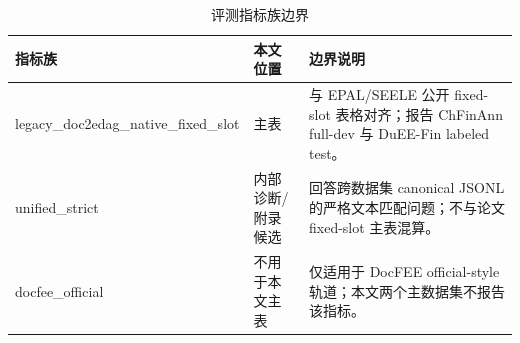 \begin{table}[htbp]
\centering
\caption{评测指标族边界}
\label{tab:metric-families}
\small
\begin{tabular}{>{\raggedright\arraybackslash}p{}>{\raggedright\arraybackslash}p{}>{\raggedright\arraybackslash}p{}}
\toprule
指标族 & 本文位置 & 边界说明 \\
\midrule
legacy\_\allowbreak{}doc2edag\_\allowbreak{}native\_\allowbreak{}fixed\_\allowbreak{}slot & 主表 & 与 EPAL/SEELE 公开 fixed-slot 表格对齐；报告 ChFinAnn full-dev 与 DuEE-Fin labeled test。 \\
unified\_\allowbreak{}strict & 内部诊断/附录候选 & 回答跨数据集 canonical JSONL 的严格文本匹配问题；不与论文 fixed-slot 主表混算。 \\
docfee\_\allowbreak{}official & 不用于本文主表 & 仅适用于 DocFEE official-style 轨道；本文两个主数据集不报告该指标。 \\
\bottomrule
\end{tabular}
\end{table}
